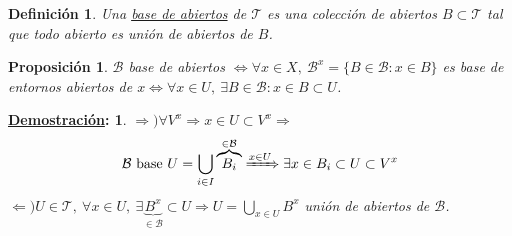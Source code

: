 \documentclass[10pt,a4paper,openright]{book}
\theoremstyle{break}
\newtheorem*{defi}{Definición}
\newtheorem*{prop}{Proposición}
\newtheorem*{demo}{\underline{Demostración}:}
\begin{document}
\begin{defi}
Una \underline{base de abiertos} de $\mathcal{T}$ es una colección de abiertos $B \subset \mathcal{T}$ tal que todo abierto es unión de abiertos de $B$.
\end{defi}

\begin{prop}
$\mathcal{B}$ base de abiertos $\Leftrightarrow \forall x \in X,\ \mathcal{B}^x = \{B \in \mathcal{B} : x \in B\}$ es base de entornos abiertos de $x \Leftrightarrow \forall x \in U,\ \exists B \in \mathcal{B} : x \in B \subset U$.
\end{prop}
\begin{demo}
$\Rightarrow) \forall V^x \Rightarrow x \in U \subset V^x \Rightarrow$
\[
    \mathcal{B} \text{ base } U = \bigcup_{i \in  I} \overbrace{B_i}^{\in \mathcal{B}} \xRightarrow{x \in U} \exists x \in B_i \subset U \subset V^x
\]
$\Leftarrow) U \in \mathcal{T},\ \forall x \in U,\ \exists \underbrace{B^x}_{\in \mathcal{B}} \subset U \Rightarrow U = \bigcup_{x \in U} B^x$ unión de abiertos de $\mathcal{B}$.
\end{demo}
\end{document}
